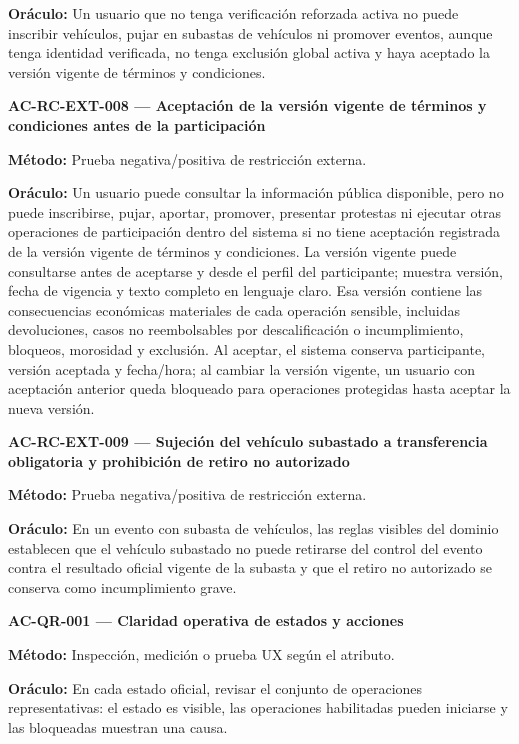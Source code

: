 \documentclass[10pt,letterpaper]{article}
\begin{document}
\textbf{Oráculo:} Un usuario que no tenga verificación reforzada activa no puede inscribir vehículos, pujar en subastas de vehículos ni promover eventos, aunque tenga identidad verificada, no tenga exclusión global activa y haya aceptado la versión vigente de términos y condiciones.\par\vspace{0.45em}
\noindent\textbf{AC-RC-EXT-008 --- Aceptación de la versión vigente de términos y condiciones antes de la participación}\par
\textbf{Método:} Prueba negativa/positiva de restricción externa.\par
\textbf{Oráculo:} Un usuario puede consultar la información pública disponible, pero no puede inscribirse, pujar, aportar, promover, presentar protestas ni ejecutar otras operaciones de participación dentro del sistema si no tiene aceptación registrada de la versión vigente de términos y condiciones. La versión vigente puede consultarse antes de aceptarse y desde el perfil del participante; muestra versión, fecha de vigencia y texto completo en lenguaje claro. Esa versión contiene las consecuencias económicas materiales de cada operación sensible, incluidas devoluciones, casos no reembolsables por descalificación o incumplimiento, bloqueos, morosidad y exclusión. Al aceptar, el sistema conserva participante, versión aceptada y fecha/hora; al cambiar la versión vigente, un usuario con aceptación anterior queda bloqueado para operaciones protegidas hasta aceptar la nueva versión.\par\vspace{0.45em}
\noindent\textbf{AC-RC-EXT-009 --- Sujeción del vehículo subastado a transferencia obligatoria y prohibición de retiro no autorizado}\par
\textbf{Método:} Prueba negativa/positiva de restricción externa.\par
\textbf{Oráculo:} En un evento con subasta de vehículos, las reglas visibles del dominio establecen que el vehículo subastado no puede retirarse del control del evento contra el resultado oficial vigente de la subasta y que el retiro no autorizado se conserva como incumplimiento grave.\par\vspace{0.45em}
\noindent\textbf{AC-QR-001 --- Claridad operativa de estados y acciones}\par
\textbf{Método:} Inspección, medición o prueba UX según el atributo.\par
\textbf{Oráculo:} En cada estado oficial, revisar el conjunto de operaciones representativas: el estado es visible, las operaciones habilitadas pueden iniciarse y las bloqueadas muestran una causa.\par\vspace{0.45em}
\end{document}
